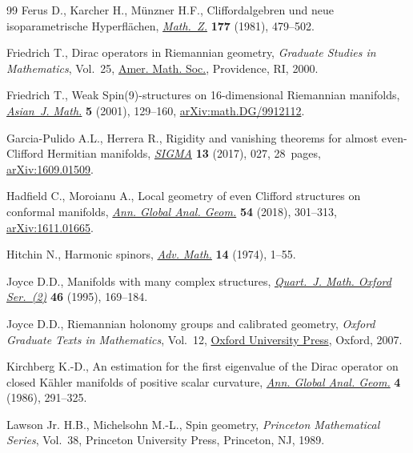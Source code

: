 \begin{thebibliography}{99}
Ferus D., Karcher H., M\"{u}nzner H.F., Cliffordalgebren und neue
 isoparametrische {H}yperfl\"{a}chen, \href{https://doi.org/10.1007/BF01219082}{\textit{Math.~Z.}} \textbf{177} (1981),
 479--502.

Friedrich T., Dirac operators in {R}iemannian geometry, \textit{Graduate
 Studies in Mathematics}, Vol.~25, \href{https://doi.org/10.1090/gsm/025}{Amer. Math. Soc.}, Providence, RI, 2000.

Friedrich T., Weak {S}pin(9)-structures on 16-dimensional {R}iemannian
 manifolds, \href{https://doi.org/10.4310/AJM.2001.v5.n1.a9}{\textit{Asian~J. Math.}} \textbf{5} (2001), 129--160,
 \href{https://arxiv.org/abs/math.DG/9912112}{arXiv:math.DG/9912112}.

Garcia-Pulido A.L., Herrera R., Rigidity and vanishing theorems for almost
 even-{C}lifford {H}ermitian manifolds, \href{https://doi.org/10.3842/SIGMA.2017.027}{\textit{SIGMA}} \textbf{13} (2017),
 027, 28~pages, \href{https://arxiv.org/abs/1609.01509}{arXiv:1609.01509}.

Hadfield C., Moroianu A., Local geometry of even {C}lifford structures on
 conformal manifolds, \href{https://doi.org/10.1007/s10455-018-9602-8}{\textit{Ann. Global Anal. Geom.}} \textbf{54} (2018),
 301--313, \href{https://arxiv.org/abs/1611.01665}{arXiv:1611.01665}.

Hitchin N., Harmonic spinors, \href{https://doi.org/10.1016/0001-8708(74)90021-8}{\textit{Adv. Math.}} \textbf{14} (1974), 1--55.

Joyce D.D., Manifolds with many complex structures, \href{https://doi.org/10.1093/qmath/46.2.169}{\textit{Quart.~J. Math.
 Oxford Ser.~(2)}} \textbf{46} (1995), 169--184.

Joyce D.D., Riemannian holonomy groups and calibrated geometry, \textit{Oxford
 Graduate Texts in Mathematics}, Vol.~12, \href{https://doi.org/10.1007/978-3-642-19004-9_1}{Oxford University Press}, Oxford,
 2007.

Kirchberg K.-D., An estimation for the first eigenvalue of the {D}irac operator
 on closed {K}\"{a}hler manifolds of positive scalar curvature, \href{https://doi.org/10.1007/BF00128050}{\textit{Ann.
 Global Anal. Geom.}} \textbf{4} (1986), 291--325.

Lawson Jr. H.B., Michelsohn M.-L., Spin geometry, \textit{Princeton Mathematical
 Series}, Vol.~38, Princeton University Press, Princeton, NJ, 1989.


\end{thebibliography}

